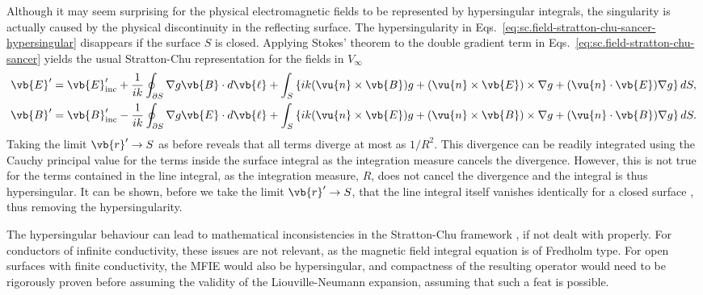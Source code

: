 \documentclass[11pt,SymmetricalJury]{inrsthesis/inrsthesis}
\begin{document}
Although it may seem surprising for the
physical electromagnetic fields to be represented by hypersingular integrals,
the singularity is actually caused by the physical discontinuity in the reflecting surface.
The hypersingularity in Eqs.~\eqref{eq:sc.field-stratton-chu-sancer-hypersingular}
disappears if the surface $S$ is closed. Applying Stokes' theorem to the double gradient
term in Eqs.~\eqref{eq:sc.field-stratton-chu-sancer} yields the usual Stratton-Chu
representation for the fields in $V_\infty$
  \begin{subequations}
  \label{eq:sc.field.stratton-chu}
  \begin{align}
    \vb{E}'   &= \vb{E}_\text{inc}'+\frac{1}{ik}\oint_{\partial S} \nabla g \vb{B}\cdot d\vb{\ell}
                  + \int_S\left\{ ik(\vu{n}\times\vb{B})g
                  + (\vu{n}\times\vb{E})\times\nabla g
                  + (\vu{n}\cdot\vb{E})\nabla g
                 \right\} dS, \\
    \vb{B}'   &= \vb{B}_\text{inc}'-\frac{1}{ik}\oint_{\partial S} \nabla g \vb{E}\cdot d\vb{\ell}
                  + \int_S\left\{ ik(\vu{n}\times\vb{E})g
                  + (\vu{n}\times\vb{B})\times\nabla g
                  + (\vu{n}\cdot\vb{B})\nabla g
                 \right\} dS.
  \end{align}
  \end{subequations}
Taking the limit $\vb{r}'\rightarrow S$ as before reveals that all terms diverge
at most as $1/R^2$. This divergence can be readily integrated using the Cauchy
principal value for the terms inside the surface integral as the integration
measure cancels the divergence. However, this is not true for the terms
contained in the line integral, as the integration measure, $R$, does not cancel
the divergence and the integral is thus hypersingular. It can be shown, before
we take the limit $\vb{r}'\rightarrow S$, that the line integral itself vanishes
identically for a closed surface \cite{Sancer1968}, thus removing the
hypersingularity.

The hypersingular behaviour can lead to mathematical inconsistencies in the
Stratton-Chu framework \cite{Asvestas1980}, if not dealt with properly. For
conductors of infinite conductivity, these issues are not relevant, as the
magnetic field integral equation is of Fredholm type. For open surfaces with
finite conductivity, the MFIE would also be hypersingular, and compactness of
the resulting operator would need to be rigorously proven before assuming the
validity of the Liouville-Neumann expansion, assuming that such a feat is
possible.
\end{document}
